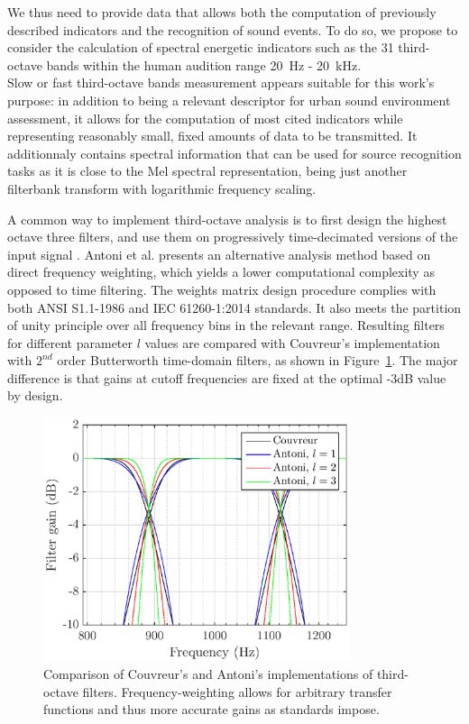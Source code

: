 \documentclass[sensors,article,submit,moreauthors,pdftex,10pt,a4paper]{mdpi}
\begin{document}
We thus need to provide data that allows both the computation of previously described indicators and the recognition of sound events.
To do so, we propose to consider the calculation of spectral energetic indicators such as the 31 third-octave bands within the human audition range 20~Hz - 20~kHz.\\ Slow or fast third-octave bands measurement appears suitable for this work's purpose: in addition to being a relevant descriptor \cite{torija2013} for urban sound environment assessment, it allows for the computation of most cited indicators while representing reasonably small, fixed amounts of data to be transmitted. It additionnaly contains spectral information that can be used for source recognition tasks as it is close to the Mel spectral representation, being just another filterbank transform with logarithmic frequency scaling.

A common way to implement third-octave analysis is to first design the highest octave three filters, and use them on progressively time-decimated versions of the input signal \cite{davis1986}. Antoni et al. \cite{antoni2010} presents an alternative analysis method based on direct frequency weighting, which yields a lower computational complexity as opposed to time filtering. The weights matrix design procedure complies with both ANSI S1.1-1986 \cite{citeulike:9580295} and IEC 61260-1:2014 \cite{iec-norm} standards. It also meets the partition of unity principle over all frequency bins in the relevant range. Resulting filters for different parameter $l$ values are compared with Couvreur's implementation \cite{couvreur} with $2^{nd}$ order Butterworth time-domain filters, as shown in Figure~\ref{fig:freq_filt}. The major difference is that gains at cutoff frequencies are fixed at the optimal -3dB value by design.\\

\begin{figure}[htbp]
	\centering
		\includegraphics[width=0.8\textwidth]{figures/tob_imp.eps}
	\caption{Comparison of Couvreur's and Antoni's implementations of third-octave filters. Frequency-weighting allows for arbitrary transfer functions and thus more accurate gains as standards impose.}
	\label{fig:freq_filt}
\end{figure}
\end{document}
